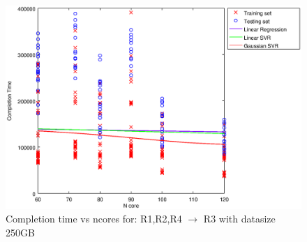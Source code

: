 
\begin {figure}[hbtp]
\centering
\includegraphics[width=\textwidth]{output/R1,R2,R4_R3_250_ALL_FEATURES/plot_R1,R2,R4_R3_250_bestmodels.eps}
\caption{Completion time vs ncores for: R1,R2,R4 $\rightarrow$ R3 with datasize 250GB}
\label{fig:coreonly_linear_R1,R2,R4_R3_250}
\end {figure}
